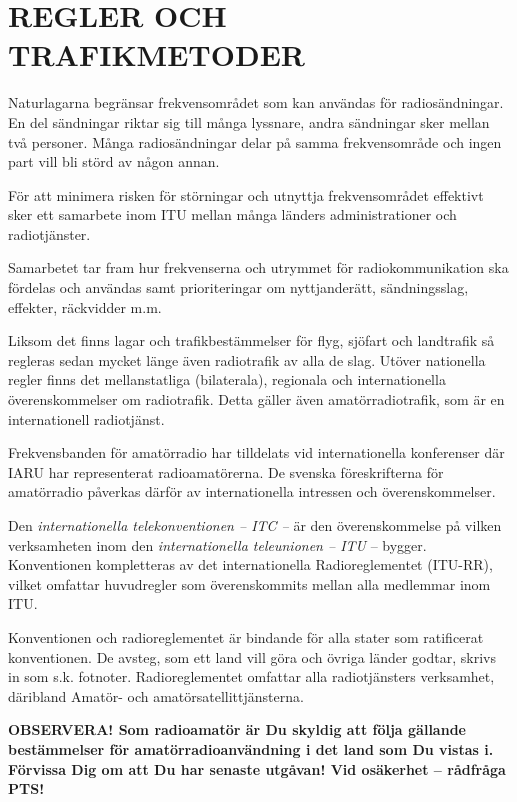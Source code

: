 \chapter{REGLER OCH TRAFIKMETODER}

Naturlagarna begränsar frekvensområdet som kan användas för radiosändningar.
En del sändningar riktar sig till många lyssnare, andra sändningar sker
mellan två personer. Många radiosändningar delar på samma frekvensområde och
ingen part vill bli störd av någon annan.

För att minimera risken för störningar och utnyttja frekvensområdet effektivt
sker ett samarbete inom ITU mellan många länders administrationer och
radiotjänster.

Samarbetet tar fram hur frekvenserna och utrymmet för radiokommunikation ska
fördelas och användas samt prioriteringar om nyttjanderätt, sändningsslag,
effekter, räckvidder m.m.

Liksom det finns lagar och trafikbestämmelser för flyg, sjöfart och landtrafik
så regleras sedan mycket länge även radiotrafik av alla de slag. Utöver
nationella regler finns det mellanstatliga (bilaterala), regionala och
internationella överenskommelser om radiotrafik. Detta gäller även
amatörradiotrafik, som är en internationell radiotjänst.

Frekvensbanden för amatörradio har tilldelats vid internationella konferenser
där IARU har representerat radioamatörerna. De svenska föreskrifterna för
amatörradio påverkas därför av internationella intressen och överenskommelser.

Den \emph{internationella telekonventionen -- ITC --} är den
överenskommelse på vilken verksamheten inom den \emph{internationella
teleunionen -- ITU} -- bygger. Konventionen kompletteras av det internationella
Radioreglementet (ITU-RR), vilket omfattar huvudregler som överenskommits mellan
alla medlemmar inom ITU.

Konventionen och radioreglementet är bindande för alla stater som ratificerat
konventionen. De avsteg, som ett land vill göra och övriga länder godtar,
skrivs in som s.k. fotnoter. Radioreglementet omfattar alla radiotjänsters
verksamhet, däribland Amatör- och amatörsatellittjänsterna.

\textbf{OBSERVERA!  Som radioamatör är Du skyldig att följa gällande
  bestämmelser för amatörradioanvändning i det land som Du vistas i.
  Förvissa Dig om att Du har senaste utgåvan!  Vid osäkerhet --
  rådfråga PTS!}
